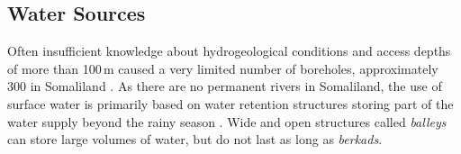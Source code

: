 \subsection{Water Sources}\label{subsec:water_sources}

Often insufficient knowledge about hydrogeological conditions and access depths of more than 100\,m caused a very limited number of boreholes, approximately 300 in Somaliland \autocite{faoswalimHydrogeologicalSurveyAssessment2012, petrucciLandscapeLandformsNorthern2022, salemTerritorialDiagnosticReport2016}. As there are no permanent rivers in Somaliland, the use of surface water is primarily based on water retention structures storing part of the water supply beyond the rainy season \autocite{petrucciLandscapeLandformsNorthern2022}. Wide and open structures called \textit{balleys} can store large volumes of water, but do not last as long as \textit{berkads}. %
